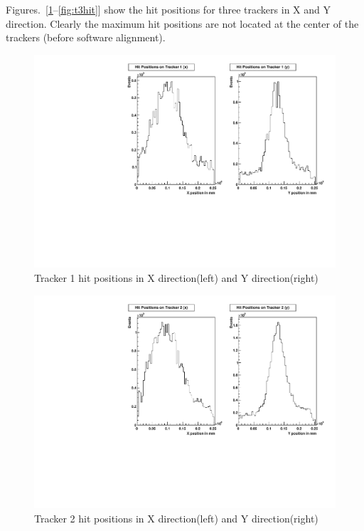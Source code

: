 Figures.~[\ref{fig:t1hit}--\ref{fig:t3hit}] show the hit positions for three trackers in X and Y direction. Clearly the maximum hit positions are not located at the center of the trackers (before software alignment).

\begin{figure}[!htbp]
\centering
\includegraphics[width=5.1in]{figures/GEM/Tracker1_Hit_position_Run1897.pdf}
\caption{Tracker 1 hit positions in X direction(left) and Y direction(right)}\label{fig:t1hit}
\end{figure}

\begin{figure}[!htbp]
\centering
\includegraphics[width=5.1in]{figures/GEM/Tracker2_Hit_position_Run1897.pdf}
\caption{Tracker 2 hit positions in X direction(left) and Y direction(right)}\label{fig:t2hit}
\end{figure}

